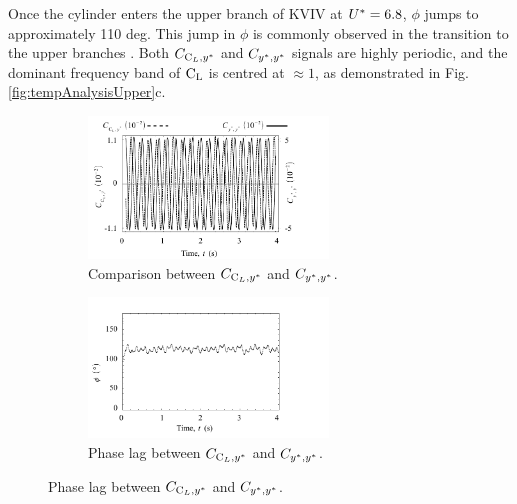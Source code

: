 \documentclass[oneside]{utmthesis}
\begin{document}
Once the cylinder enters the upper branch of KVIV at $U^{*} = 6.8$, $\phi$ jumps to approximately 110 deg. This jump in $\phi$ is commonly observed in the transition to the upper branches \citep{Maruai2018}. Both $C_{\text{C}_{L},y^{*}}$ and $C_{y^{*},y^{*}}$ signals are highly periodic, and the dominant frequency band of $\text{C}_{\text{L}}$ is centred at $\approx 1$, as demonstrated in Fig. \ref{fig:tempAnalysisUpper}c.

\begin{figure}[H]
  \centering
  \begin{subfigure}[h]{1\textwidth}
    \hspace{2.4cm}
    \includegraphics[width=0.7\textwidth]{figs/tempAnalysisUpper-a}
    \caption{Comparison between $C_{\text{C}_{L},y^{*}}$ and $C_{y^{*},y^{*}}$.}
    \label{fig:tempAnalysisUpper-a}
  \end{subfigure}

  \begin{subfigure}[h]{1\textwidth}
    \hspace{2.4cm}
    \includegraphics[width=0.7\textwidth]{figs/tempAnalysisUpper-b}
    \caption{Phase lag between $C_{\text{C}_{L},y^{*}}$ and $C_{y^{*},y^{*}}$.}
    \label{fig:tempAnalysisUpper-b}
  \end{subfigure}


\end{figure}
\end{document}
